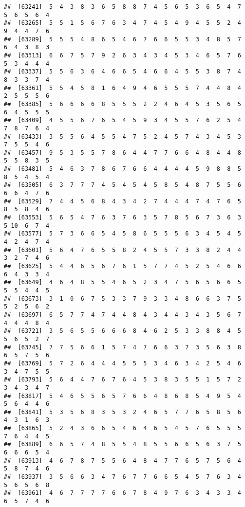 \documentclass[
]{book}
\begin{document}
\begin{verbatim}
##  [63241]  5  4  3  8  3  6  5  8  8  7  4  5  6  5  3  6  5  4  7  5  6  5  6  4
##  [63265]  5  5  1  5  6  7  6  3  4  7  4  5  4  9  4  5  5  2  4  9  4  4  7  6
##  [63289]  5  5  5  4  8  6  5  4  6  7  6  6  5  5  3  4  8  5  7  6  4  3  8  3
##  [63313]  6  6  7  5  7  9  2  6  3  4  3  4  5  3  4  6  5  7  6  5  3  4  4  4
##  [63337]  5  5  6  3  6  4  6  6  5  4  6  6  4  5  5  3  8  7  4  8  3  3  7  4
##  [63361]  5  5  4  5  8  1  6  4  9  4  6  5  5  5  7  4  4  8  4  2  5  5  5  6
##  [63385]  5  6  6  6  6  8  5  5  5  2  2  4  6  4  5  3  5  6  5  6  4  5  5  5
##  [63409]  4  5  5  6  7  6  5  4  5  9  3  4  5  5  7  6  2  5  4  7  8  7  6  4
##  [63433]  3  5  5  6  4  5  5  4  7  5  2  4  5  7  4  3  4  5  3  7  5  5  4  6
##  [63457]  9  5  3  5  5  7  8  6  4  4  7  7  6  6  4  8  4  4  8  5  5  8  3  5
##  [63481]  5  4  6  3  7  8  6  7  6  6  4  4  4  4  5  9  8  8  5  8  5  4  5  4
##  [63505]  6  3  7  7  7  4  5  4  5  4  5  8  5  4  8  7  5  5  6  6  6  4  7  6
##  [63529]  7  4  4  5  6  8  4  3  4  2  7  4  4  4  7  4  7  6  5  8  5  8  4  6
##  [63553]  5  6  5  4  7  6  3  7  6  3  5  7  8  5  6  7  3  6  3  5 10  6  7  4
##  [63577]  5  7  3  6  6  5  4  5  8  6  5  5  5  6  3  4  5  4  5  4  2  4  7  4
##  [63601]  5  6  4  7  6  5  5  8  2  4  5  5  7  3  3  8  2  4  4  3  2  7  4  6
##  [63625]  5  4  4  6  5  6  7  6  1  5  7  7  4  5  2  5  4  6  6  6  4  3  3  4
##  [63649]  4  6  4  8  5  5  4  6  5  2  3  4  7  5  6  5  6  6  5  5  5  4  4  5
##  [63673]  3  1  0  6  7  5  3  3  7  9  3  3  4  8  6  6  3  7  5  5  2  5  6  2
##  [63697]  6  5  7  7  4  7  4  4  8  4  3  4  4  3  4  3  5  6  7  4  4  4  8  4
##  [63721]  3  5  6  5  5  6  6  6  8  4  6  2  5  3  3  8  8  4  5  5  6  5  2  7
##  [63745]  7  7  5  6  6  1  5  7  4  7  6  6  3  7  3  5  6  3  8  6  5  7  5  6
##  [63769]  5  7  2  6  4  4  4  5  5  5  3  4  6  3  4  2  5  4  6  3  4  7  5  5
##  [63793]  5  6  4  4  7  6  7  6  4  5  3  8  3  5  5  1  5  7  2  3  4  3  4  7
##  [63817]  5  4  6  5  5  6  5  7  6  6  4  8  6  8  5  4  9  5  4  5  6  4  4  6
##  [63841]  5  3  5  6  8  3  5  3  2  4  6  5  7  7  6  5  8  5  6  4  3  1  6  3
##  [63865]  5  2  4  3  6  6  5  4  6  4  6  5  4  5  7  6  5  5  5  7  6  4  4  5
##  [63889]  6  6  5  7  4  8  5  5  4  8  5  5  6  6  5  6  3  7  5  6  6  6  5  4
##  [63913]  4  6  7  8  7  5  5  6  4  8  4  7  7  6  5  7  5  6  4  5  8  7  4  6
##  [63937]  3  5  6  6  3  4  7  6  7  7  6  6  5  4  5  7  6  3  4  5  6  5  6  8
##  [63961]  4  6  7  7  7  7  6  6  7  8  4  9  7  6  3  4  3  3  4  6  5  7  4  6

\end{verbatim}
\end{document}
